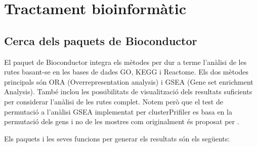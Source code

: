 \chapter{Tractament bioinformàtic}

\section{Cerca dels paquets de Bioconductor}

El paquet  de Bioconductor integra els mètodes per dur a terme l'anàlisi de les rutes basant-se en les bases de dades GO, KEGG i Reactome. Els dos mètodes principals són ORA (Overrepresentation analysis) i GSEA (Gene set enrichment Analysis). També inclou les possibilitats de visualització dels resultats suficients per considerar l'anàlisi de les rutes complet. Notem però que el test de permutació a l'anàlisi GSEA implementat per clusterPrifiler es basa en la permutació dels gens i no de les mostres com originalment és proposat per \cite{subramanian2005gene}.

Els paquets i les seves funcions per generar els resultats són els següents: 

